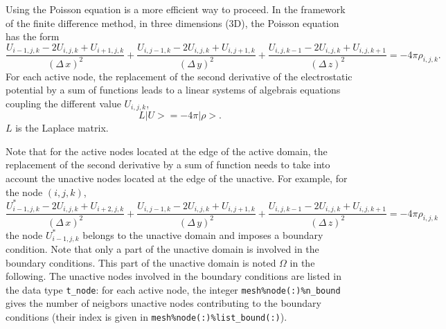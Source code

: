 \documentclass[11pt,a4paper]{article}
\begin{document}
Using the Poisson equation is a more efficient way to proceed. In the framework of the finite difference method, in three dimensions (3D), the Poisson equation has the form
\begin{equation}
  \frac{U_{i-1,j,k}-2U_{i,j,k}+U_{i+1,j,k}}{(\Delta\,x)^2}+
  \frac{U_{i,j-1,k}-2U_{i,j,k}+U_{i,j+1,k}}{(\Delta\,y)^2}+
  \frac{U_{i,j,k-1}-2U_{i,j,k}+U_{i,j,k+1}}{(\Delta\,z)^2}=-4\pi\rho_{i,j,k}.
\end{equation}
For each active node, the replacement of the second derivative of the electrostatic potential by a sum of functions leads to a linear systems of algebrais equations coupling the different value $U_{i,j,k}$,
\begin{equation}
  L|U>=-4\pi|\rho>.
\end{equation}
$L$ is the Laplace matrix.

Note that for the active nodes located at the edge of the active domain, the replacement of the second derivative by a sum of function needs to take into account the unactive nodes located at the edge of the unactive. For example, for the node $(i,j,k)$, 
\begin{equation}
  \frac{U_{i-1,j,k}^*-2U_{i,j,k}+U_{i+2,j,k}}{(\Delta\,x)^2}+
  \frac{U_{i,j-1,k}-2U_{i,j,k}+U_{i,j+1,k}}{(\Delta\,y)^2}+
  \frac{U_{i,j,k-1}-2U_{i,j,k}+U_{i,j,k+1}}{(\Delta\,z)^2}=-4\pi\rho_{i,j,k}
\end{equation}
the node $U_{i-1,j,k}^*$ belongs to the unactive domain and imposes a boundary condition. Note that only a part of the unactive domain is involved in the boundary conditions. This part of the unactive domain is noted $\Omega$ in the following.
The unactive nodes involved in the boundary conditions are listed in the data type \verb+t_node+: for each active node, the integer \verb+mesh%node(:)%n_bound+ gives the number of neigbors unactive nodes contributing to the boundary conditions (their index is given in \verb+mesh%node(:)%list_bound(:)+).
\end{document}
